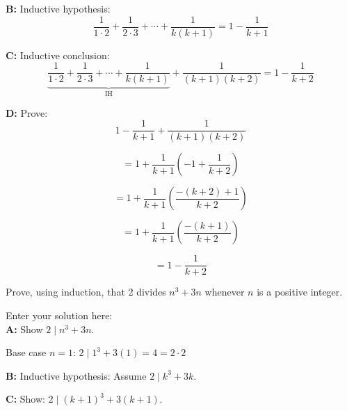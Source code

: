 \documentclass[10pt]{exam}
\begin{document}
\begin{questions}
\begin{solution}
    \textbf{B:} Inductive hypothesis:
    \[\frac{1}{1\cdot2} + \frac{1}{2\cdot3} + \cdots + \frac{1}{k(k+1)} = 1 - \frac{1}{k+1}\]
    
    \textbf{C:} Inductive conclusion:
    \[\underbrace{\frac{1}{1\cdot2} + \frac{1}{2\cdot3} + \cdots + \frac{1}{k(k+1)}}_{\text{IH}}+ \frac{1}{(k+1)(k+2)} = 1 - \frac{1}{k+2}\]
    
    \textbf{D:} Prove:
    \[1 - \frac{1}{k+1} + \frac{1}{(k+1)(k+2)}\]
    
    \[= 1 + \frac{1}{k+1}\left(-1 + \frac{1}{k+2}\right)\]
    
    \[= 1 + \frac{1}{k+1}\left(\frac{-(k+2)+1}{k+2}\right)\]
    
    \[= 1 + \frac{1}{k+1}\left(\frac{-(k+1)}{k+2}\right)\]
    
    \[= 1 - \frac{1}{k+2}\]

\end{solution}

\question[8] Prove, using induction, that 2 divides $n^3 + 3n$ whenever $n$ is a positive integer.

\begin{solution}
    Enter your solution here:\\
    \textbf{A:} Show $2 \mid n^3 + 3n$.
    
    Base case $n = 1$: $2 \mid 1^3 + 3(1) = 4 = 2 \cdot 2$ \checkmark
    
    \textbf{B:} Inductive hypothesis: Assume $2 \mid k^3 + 3k$.
    
    \textbf{C:} Show: $2 \mid (k+1)^3 + 3(k+1)$.
    

\end{solution}
\end{questions}
\end{document}
